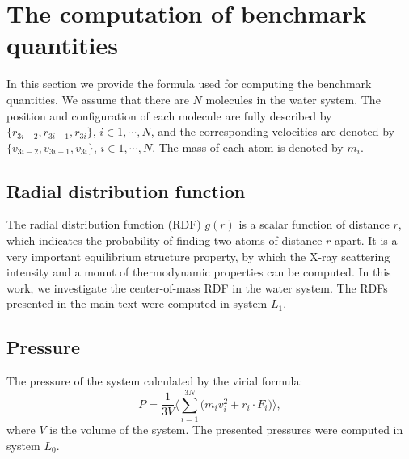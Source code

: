 \documentclass[a4paper,preprint,unsortedaddress,onecolumn,fleqn]{revtex4}
\begin{document}
\bigskip

\appendix

\section{The computation of benchmark quantities}

\label{appendix:benchmark}

In this section we provide the formula used for computing the benchmark
quantities. We assume that there are $N$ molecules in the water system. The
position and configuration of each molecule are fully described by $\{%
\mathbf{\mathit{r}}_{3i-2},\mathbf{\mathit{r}}_{3i-1},\mathbf{\mathit{r}}%
_{3i}\},\,i\in 1,\cdots ,N$, and the corresponding velocities are denoted by 
$\{\mathbf{\mathit{v}}_{3i-2},\mathbf{\mathit{v}}_{3i-1},\mathbf{\mathit{v}}%
_{3i}\},\,i\in 1,\cdots ,N$. The mass of each atom is denoted by $m_{i}$.

\subsection{Radial distribution function}

The radial distribution function (RDF) $g(r)$ is a scalar function of
distance $r$, which indicates the probability of finding two atoms of
distance $r$ apart. It is a very important equilibrium structure property,
by which the X-ray scattering intensity and a mount of thermodynamic
properties can be computed. In this work, we investigate the center-of-mass
RDF in the water system. The RDFs presented in the main text were computed
in system $L_1$.


\subsection{Pressure}

The pressure of the system calculated by the virial formula:
\begin{equation*}
P=\frac{1}{3V}\Bigg\langle\sum_{i=1}^{3N}\Big(m_{i}\mathbf{\mathit{v}}%
_{i}^{2}+\mathbf{\mathit{r}}_{i}\cdot \mathbf{\mathit{F}}_{i}\Big)%
\Bigg\rangle,
\end{equation*}%
where $V$ is the volume of the system. The presented pressures were computed
in system $L_{0}$.
\end{document}
